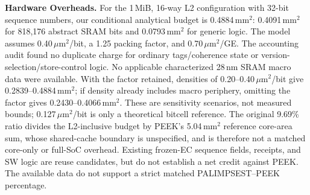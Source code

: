 \noindent\textbf{Hardware Overheads.}
For the 1\,MiB, 16-way L2 configuration with 32-bit sequence numbers,
our conditional analytical budget is 0.4884\,mm$^2$: 0.4091\,mm$^2$ for
818,176 abstract SRAM bits and 0.0793\,mm$^2$ for generic logic.
The model assumes 0.40\,$\mu$m$^2$/bit, a 1.25 packing factor, and
0.70\,$\mu$m$^2$/GE. The accounting audit found no duplicate charge for
ordinary tags/coherence state or version-selection/store-control logic.
No applicable characterized 28\,nm SRAM macro data were available.
With the factor retained, densities of 0.20--0.40\,$\mu$m$^2$/bit give
0.2839--0.4884\,mm$^2$; if density already includes macro periphery,
omitting the factor gives 0.2430--0.4066\,mm$^2$.
These are sensitivity scenarios, not measured bounds; 0.127\,$\mu$m$^2$/bit
is only a theoretical bitcell reference.
The original 9.69\% ratio divides the L2-inclusive budget by PEEK's
5.04\,mm$^2$ reference core-area sum, whose shared-cache boundary is
unspecified, and is therefore not a matched core-only or full-SoC overhead.
Existing frozen-EC sequence fields, receipts, and SW logic are reuse
candidates, but do not establish a net credit against PEEK.
The available data do not support a strict matched PALIMPSEST--PEEK percentage.
